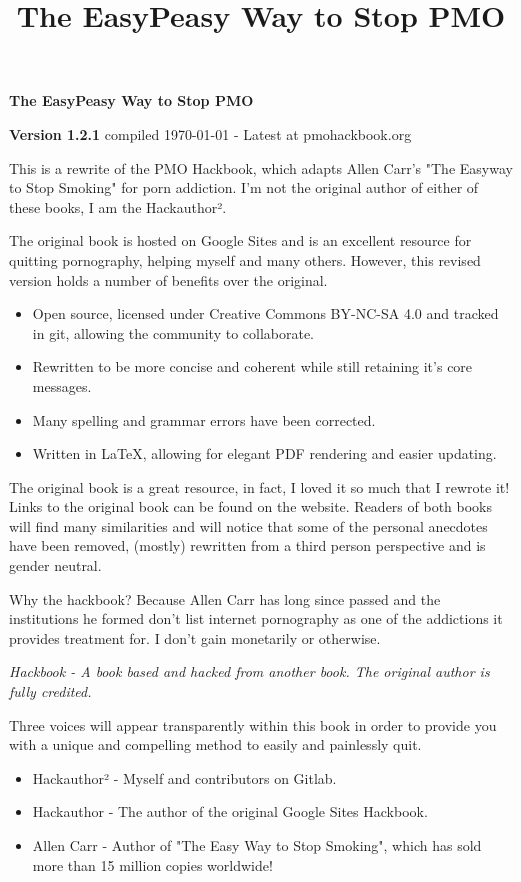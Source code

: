 \documentclass[easypeasy.tex]{subfiles}
\title {The EasyPeasy Way to Stop PMO}
\begin{document}
\thispagestyle{empty}

\begin{center}
  {\Huge\bfseries The EasyPeasy Way to Stop PMO \par}
  {\small \textbf{Version 1.2.1} compiled {\today} - Latest at pmohackbook.org}
\end{center}

This is a rewrite of the PMO Hackbook, which adapts Allen Carr's "The Easyway to Stop Smoking" for porn addiction. I'm not the original author of either of these books, I am the Hackauthor².

The original book is hosted on Google Sites and is an excellent resource for quitting pornography, helping myself and many others. However, this revised version holds a number of benefits over the original.
\begin{itemize}
\item Open source, licensed under Creative Commons BY-NC-SA 4.0 and tracked in git, allowing the community to collaborate.
\item Rewritten to be more concise and coherent while still retaining it's core messages.
\item Many spelling and grammar errors have been corrected.
\item Written in LaTeX, allowing for elegant PDF rendering and easier updating.
\end{itemize}

The original book is a great resource, in fact, I loved it so much that I rewrote it! Links to the original book can be found on the website. Readers of both books will find many similarities and will notice that some of the personal anecdotes have been removed, (mostly) rewritten from a third person perspective and is gender neutral.

Why the hackbook? Because Allen Carr has long since passed and the institutions he formed don't list internet pornography as one of the addictions it provides treatment for. I don't gain monetarily or otherwise.

\textit{{\small Hackbook - A book based and hacked from another book. The original author is fully credited.}}

Three voices will appear transparently within this book in order to provide you with a unique and compelling method to easily and painlessly quit.
\begin{itemize}
  \item Hackauthor² - Myself and contributors on Gitlab.
  \item Hackauthor - The author of the original Google Sites Hackbook.
  \item Allen Carr - Author of "The Easy Way to Stop Smoking", which has sold more than 15 million copies worldwide!
\end{itemize}
\end{document}
